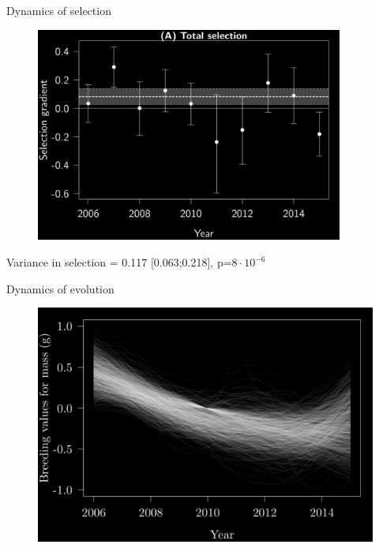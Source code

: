 \documentclass[10pt]{beamer}%
\begin{document}
\begin{frame}{Dynamics of selection}
	\begin{figure}
		\includegraphics[width=0.9\textwidth]{Figures/SelByYear-1}
	\end{figure} \vspace{-0.2cm}
	Variance in selection = 0.117 [0.063;0.218], p=$8\cdot10^{-6}$
\end{frame}

\begin{frame}{Dynamics of evolution}
	\begin{figure}
		\includegraphics[width=\textwidth]{Figures/EvolSmooth-1}
	\end{figure}
\end{frame}
\end{document}
